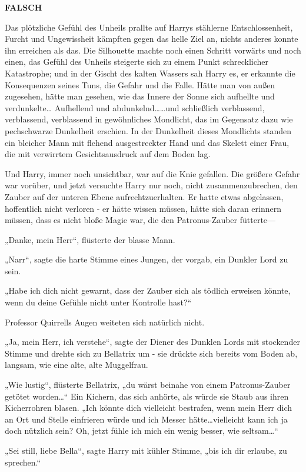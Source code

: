 {\textbf{FALSCH}

Das plötzliche Gefühl des Unheils prallte auf Harrys stählerne Entschlossenheit, Furcht und Ungewissheit kämpften gegen das helle Ziel an, nichts anderes konnte ihn erreichen als das. Die Silhouette machte noch einen Schritt vorwärts und noch einen, das Gefühl des Unheils steigerte sich zu einem Punkt schrecklicher Katastrophe; und in der Gischt des kalten Wassers sah Harry es, er erkannte die Konsequenzen seines Tuns, die Gefahr und die Falle. Hätte man von außen zugesehen, hätte man gesehen, wie das Innere der Sonne sich aufhellte und verdunkelte… Aufhellend und abdunkelnd……und schließlich verblassend, verblassend, verblassend in gewöhnliches Mondlicht, das im Gegensatz dazu wie pechschwarze Dunkelheit erschien. In der Dunkelheit dieses Mondlichts standen ein bleicher Mann mit flehend ausgestreckter Hand und das Skelett einer Frau, die mit verwirrtem Gesichtsausdruck auf dem Boden lag.

Und Harry, immer noch unsichtbar, war auf die Knie gefallen. Die größere Gefahr war vorüber, und jetzt versuchte Harry nur noch, nicht zusammenzubrechen, den Zauber auf der unteren Ebene aufrechtzuerhalten. Er hatte etwas abgelassen, hoffentlich nicht verloren - er hätte wissen müssen, hätte sich daran erinnern müssen, dass es nicht bloße Magie war, die den Patronus-Zauber fütterte—

„Danke, mein Herr“, flüsterte der blasse Mann.

„Narr“, sagte die harte Stimme eines Jungen, der vorgab, ein Dunkler Lord zu sein.

„Habe ich dich nicht gewarnt, dass der Zauber sich als tödlich erweisen könnte, wenn du deine Gefühle nicht unter Kontrolle hast?“

Professor Quirrells Augen weiteten sich natürlich nicht.

„Ja, mein Herr, ich verstehe“, sagte der Diener des Dunklen Lords mit stockender Stimme und drehte sich zu Bellatrix um - sie drückte sich bereits vom Boden ab, langsam, wie eine alte, alte Muggelfrau.

„Wie lustig“, flüsterte Bellatrix, „du wärst beinahe von einem Patronus-Zauber getötet worden…“ Ein Kichern, das sich anhörte, als würde sie Staub aus ihren Kicherrohren blasen. „Ich könnte dich vielleicht bestrafen, wenn mein Herr dich an Ort und Stelle einfrieren würde und ich Messer hätte…vielleicht kann ich ja doch nützlich sein? Oh, jetzt fühle ich mich ein wenig besser, wie seltsam…“

„Sei still, liebe Bella“, sagte Harry mit kühler Stimme, „bis ich dir erlaube, zu sprechen.“

}
